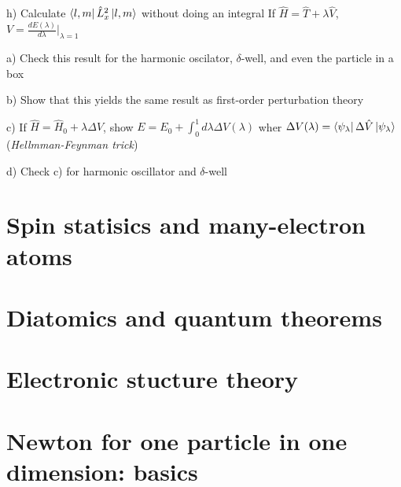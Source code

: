 h) Calculate $\bra{l,m}\hat{L}^2_x\ket{l,m}$ without doing an integral
\newpage
{}
If $\hat{H}=\hat{T} + \lambda\hat{V}$, $V = \frac{dE(\lambda)}{d\lambda}\bigg|_{\lambda=1}$

a) Check this result for the harmonic oscilator, $\delta$-well, and
even the particle in a box

b) Show that this yields the same result as first-order perturbation
theory

c) If $\hat{H}=\hat{H}_0+\lambda\Delta\hat{V}$, show $E = E_0 + \int^1_0 d\lambda\Delta V(\lambda)$
wher $\Delta V(\lambda) = \bra{\psi_{\lambda}}\Delta\hat{V}\ket{\psi_{\lambda}}$ ({\em Hellmman-Feynman trick})

d) Check c) for harmonic oscillator and $\delta$-well

\newpage
\part{Spin statisics and many-electron atoms}
\newpage
\part{Diatomics and quantum theorems}
\newpage
\part{Electronic stucture theory}
\label{page:end}


\part{Newton for one particle in one dimension: basics}
\newpage
{}

